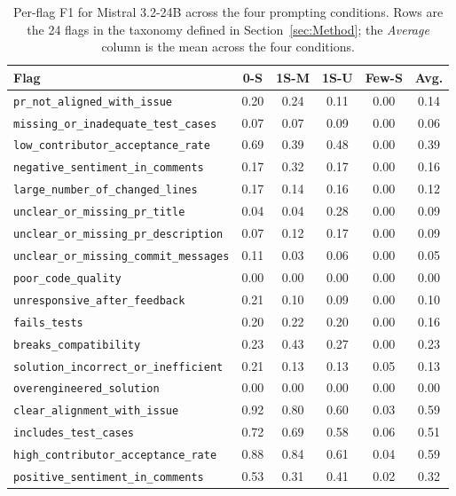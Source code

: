 \begin{table}[!htbp]
\centering
\caption{Per-flag F1 for Mistral 3.2-24B across the four prompting
conditions. Rows are the 24 flags in the taxonomy defined in
Section~\ref{sec:Method}; the \emph{Average} column is the mean across
the four conditions.}
\label{tab:perflag-mistral-3-2-24b}
\small
\begin{tabular}{lccccc}
\toprule
Flag & 0-S & 1S-M & 1S-U & Few-S & Avg. \\
\midrule
\texttt{pr\_not\_aligned\_with\_issue} & 0.20 & 0.24 & 0.11 & 0.00 & 0.14 \\
\texttt{missing\_or\_inadequate\_test\_cases} & 0.07 & 0.07 & 0.09 & 0.00 & 0.06 \\
\texttt{low\_contributor\_acceptance\_rate} & 0.69 & 0.39 & 0.48 & 0.00 & 0.39 \\
\texttt{negative\_sentiment\_in\_comments} & 0.17 & 0.32 & 0.17 & 0.00 & 0.16 \\
\texttt{large\_number\_of\_changed\_lines} & 0.17 & 0.14 & 0.16 & 0.00 & 0.12 \\
\texttt{unclear\_or\_missing\_pr\_title} & 0.04 & 0.04 & 0.28 & 0.00 & 0.09 \\
\texttt{unclear\_or\_missing\_pr\_description} & 0.07 & 0.12 & 0.17 & 0.00 & 0.09 \\
\texttt{unclear\_or\_missing\_commit\_messages} & 0.11 & 0.03 & 0.06 & 0.00 & 0.05 \\
\texttt{poor\_code\_quality} & 0.00 & 0.00 & 0.00 & 0.00 & 0.00 \\
\texttt{unresponsive\_after\_feedback} & 0.21 & 0.10 & 0.09 & 0.00 & 0.10 \\
\texttt{fails\_tests} & 0.20 & 0.22 & 0.20 & 0.00 & 0.16 \\
\texttt{breaks\_compatibility} & 0.23 & 0.43 & 0.27 & 0.00 & 0.23 \\
\texttt{solution\_incorrect\_or\_inefficient} & 0.21 & 0.13 & 0.13 & 0.05 & 0.13 \\
\texttt{overengineered\_solution} & 0.00 & 0.00 & 0.00 & 0.00 & 0.00 \\
\texttt{clear\_alignment\_with\_issue} & 0.92 & 0.80 & 0.60 & 0.03 & 0.59 \\
\texttt{includes\_test\_cases} & 0.72 & 0.69 & 0.58 & 0.06 & 0.51 \\
\texttt{high\_contributor\_acceptance\_rate} & 0.88 & 0.84 & 0.61 & 0.04 & 0.59 \\
\texttt{positive\_sentiment\_in\_comments} & 0.53 & 0.31 & 0.41 & 0.02 & 0.32 \\

\end{tabular}
\end{table}
